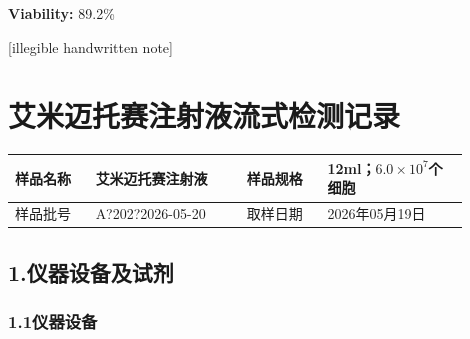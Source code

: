 \documentclass[UTF8,10pt,a4paper,fontset=fandol]{ctexart}
\newcommand{\fieldvalue}[1]{#1}
\newcommand{\handwritten}[1]{#1}
\begin{document}
\medskip
\noindent\textbf{Viability:}
\fieldvalue{89.2\%}

\vfill

\handwritten{[illegible handwritten note]}

\newpage

\section{艾米迈托赛注射液流式检测记录}

\begin{tabular}{|p{0.16\linewidth}|p{0.30\linewidth}|p{0.16\linewidth}|p{0.28\linewidth}|}
\hline
样品名称 &
\fieldvalue{艾米迈托赛注射液} &
样品规格 &
\fieldvalue{12ml；$6.0\times 10^{7}$个细胞}
\\
\hline
样品批号 &
\fieldvalue{\handwritten{A?202?2026-05-20}} &
取样日期 &
\fieldvalue{\handwritten{2026年05月19日}}
\\
\hline
\end{tabular}

\subsection{1.\quad 仪器设备及试剂}

\subsubsection{1.1\quad 仪器设备}
\end{document}
